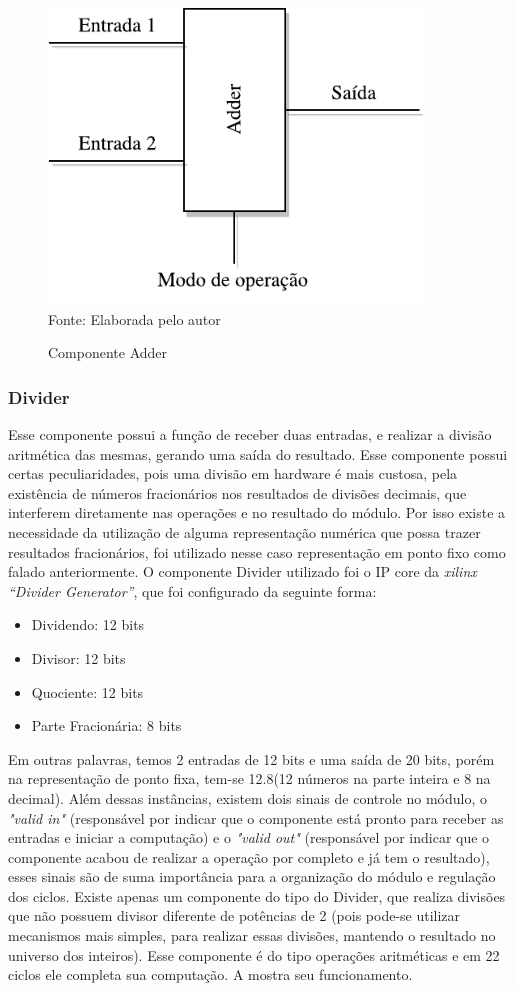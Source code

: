 \begin{figure}[H]
	\centering
	\caption{Componente Adder}
	\includegraphics[width=10cm]{figures/Adder.pdf}\\
	
	{Fonte: Elaborada pelo autor}
	\label{adder}
\end{figure}

\subsubsection{Divider}
Esse componente possui a função de receber duas entradas, e realizar a divisão aritmética das mesmas, gerando uma saída do resultado. Esse componente possui certas peculiaridades, pois uma divisão em hardware é mais custosa, pela existência de números fracionários nos resultados de divisões decimais, que interferem diretamente nas operações e no resultado do módulo. Por isso existe a necessidade da utilização de alguma representação numérica que possa trazer resultados fracionários, foi utilizado nesse caso representação em ponto fixo como falado anteriormente. O componente Divider utilizado foi o IP core da \textit{xilinx “Divider Generator”}, que foi configurado da seguinte forma: 
\begin{itemize}
	\item 	Dividendo: 12 bits
	\item 	Divisor: 12 bits
	\item 	Quociente: 12 bits
	\item 	Parte Fracionária: 8 bits
\end{itemize}
Em outras palavras, temos 2 entradas de 12 bits e uma saída de 20 bits, porém na representação de ponto fixa, tem-se 12.8(12 números na parte inteira e 8 na decimal). Além dessas instâncias, existem dois sinais de controle no módulo, o \textit{"valid in"} (responsável por indicar que o componente está pronto para receber as entradas e iniciar a computação) e o \textit{"valid out"} (responsável por indicar que o componente acabou de realizar a operação por completo e já tem o resultado), esses sinais são de suma importância para a organização do módulo e regulação dos ciclos. Existe apenas um componente do tipo do Divider, que realiza divisões que não possuem divisor diferente de potências de 2 (pois pode-se utilizar mecanismos mais simples, para realizar essas divisões, mantendo o resultado no universo dos inteiros). Esse componente é do tipo operações aritméticas e em 22 ciclos ele completa sua computação. A  mostra seu funcionamento.

